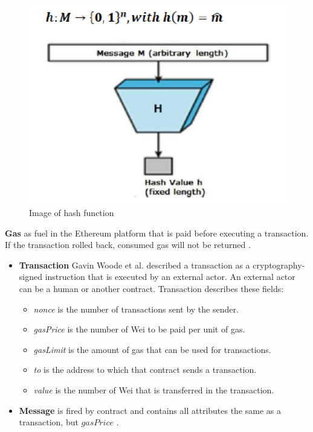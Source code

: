 \begin{center}
	\begin{figure}[htb!]
		
		\begin{minipage}{0.2\linewidth}
			\centering
			\includegraphics[width=4.5\textwidth]{images/chap01_hash_function.png}
		\end{minipage}
		\caption[Image of hash function]{Image of hash function \cite{Fips}}
		
	\end{figure}
	
\end{center}
\textbf{Gas} as fuel in the Ethereum platform that is paid before executing a transaction. If the transaction rolled back,  consumed gas will not be returned \cite{Egbertsen}.\\
\begin{itemize}
    \item \textbf{Transaction}
     Gavin Woode et al.\cite{Gavin} described a transaction as a cryptography-signed instruction that is executed by an external actor. An external actor can be a human or another contract. Transaction describes these fields:
     \begin{itemize}
         \item \textit{nonce} is the number of transactions sent by the sender.
         \item \textit{gasPrice} is the number of Wei to be paid per unit of gas.
         \item \textit{gasLimit} is the amount of gas that can be used for transactions.
         \item \textit{to} is the address to which that contract sends a transaction.
         \item \textit{value} is the number of Wei that is transferred in the transaction.
     \end{itemize}
        \item \textbf{Message} is fired by contract and contains all attributes the same as a transaction, but $gasPrice$ \cite{Egbertsen}.
\end{itemize}
